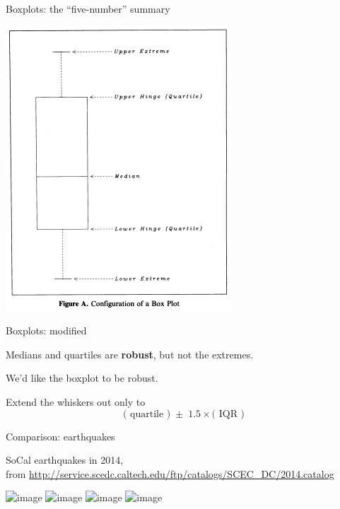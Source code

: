 \begin{frame}{Boxplots: the ``five-number'' summary}

    \begin{center}
        \includegraphics[height=.85\textheight]{boxplot-taxonomy.png}
    \end{center}

\end{frame}


\begin{frame}{Boxplots: modified}

    Medians and quartiles are \textbf{robust},
    but not the \alert{extremes}.

    \vspace{3em}

    We'd like the boxplot to be robust. 

    \vspace{3em}

    Extend the whiskers out only to
    \[
        \text{( quartile )} \; \pm \; 1.5 \times \text{( IQR )} 
    \]

\end{frame}

\begin{frame}{Comparison: earthquakes}

    SoCal earthquakes in 2014, \\
    {\small from \url{http://service.scedc.caltech.edu/ftp/catalogs/SCEC_DC/2014.catalog} }

    \begin{center}
        \includegraphics<1>[width=\textwidth]{quakes-dotplot}
        \includegraphics<2>[width=\textwidth]{quakes-hist}
        \includegraphics<3>[width=\textwidth]{quakes-boxplot}
        \includegraphics<4>[width=\textwidth]{quakes-modified-boxplot}
    \end{center}

\end{frame}


